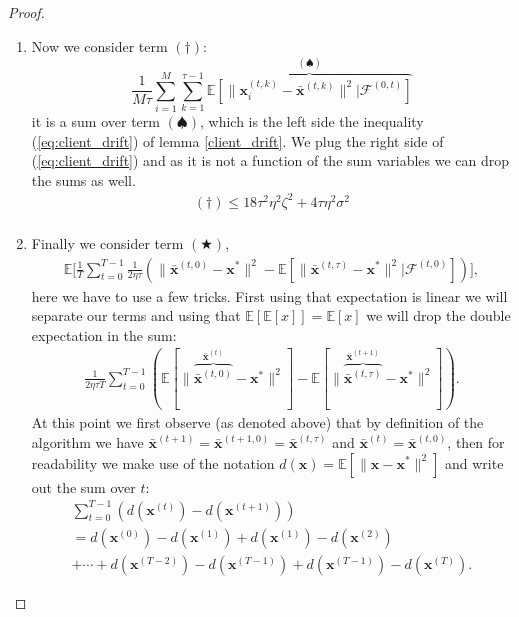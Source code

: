 \begin{proof}
\begin{enumerate}
        \item Now we consider term $(\dagger)$:
        \[ \frac{1}{M \tau}\sum^M_{i=1} \sum^{\tau-1}_{k=1} \overbrace{\mathbb{E} \left[ \| \bm{x}_i^{(t,k)} -\bar{\bm{x}}^{(t,k)} \|^2 | \mathcal{F}^{(0,t)}\right]}^{(\spadesuit)} \]
        it is a sum over term $(\spadesuit)$, which is the left side the inequality (\ref{eq:client_drift}) of lemma \ref{client_drift}. We plug the right side of (\ref{eq:client_drift}) and as it is not a function of the sum variables we can drop the sums as well.
        \begin{align*}
            (\dagger) \leq 18\tau^2 \eta^2 \zeta^2 + 4 \tau \eta^2 \sigma^2 \\
        \end{align*}
        \item Finally we consider term $(\bigstar)$, 
        \begin{align*}
            \mathbb{E}\Bigg[ \frac{1}{T} \sum_{t=0}^{T-1} \frac{1}{2 \eta \tau} \left( \| \bar{\bm{x}}^{(t,0)} -\bm{x}^{*} \|^2 - \mathbb{E}\left[  \| \bar{\bm{x}}^{(t,\tau)} -\bm{x}^{*} \|^2  | \mathcal{F}^{(t,0)}\right] \right) \Bigg],
        \end{align*}
        here we have to use a few tricks. First using that expectation is linear we will separate our terms and using that $\mathbb{E}\left[ \mathbb{E}[x] \right] = \mathbb{E}[x]$ we will drop the double expectation in the sum:
        \begin{align*}
            \frac{1}{2 \eta \tau T}  \sum_{t=0}^{T-1}   \left(\mathbb{E}\left[  \| \overbrace{\bar{\bm{x}}^{(t,0)}}^{\bar{\bm{x}}^{(t)}} -\bm{x}^{*} \|^2 \right] - \mathbb{E}\left[  \| \overbrace{\bar{\bm{x}}^{(t,\tau)}}^{\bar{\bm{x}}^{(t+1)}} -\bm{x}^{*} \|^2  \right] \right).
        \end{align*}
        At this point we first observe (as denoted above) that by definition of the algorithm we have $\bar{\bm{x}}^{(t+1)} = \bar{\bm{x}}^{(t+1,0)} = \bar{\bm{x}}^{(t,\tau)}$ and $\bar{\bm{x}}^{(t)} = \bar{\bm{x}}^{(t,0)}$, then for readability we make use of the notation $d(\bm{x}) = \mathbb{E} \left[ \| \bm{x}-\bm{x}^*\|^2 \right]$ and write out the sum over $t$:
        \begin{align*}
           \sum_{t=0}^{T-1}  \left( d(\bm{x}^{(t)}) - d(\bm{x}^{(t+1)}) \right)
            \\=  d(\bm{x}^{(0)}) - d(\bm{x}^{(1)}) +  d(\bm{x}^{(1)}) - d(\bm{x}^{(2)})  \\
            + \cdots +  d(\bm{x}^{(T-2)}) - d(\bm{x}^{(T-1)})  + d(\bm{x}^{(T-1)}) - d(\bm{x}^{(T)}) .

\end{align*}
\end{enumerate}
\end{proof}
